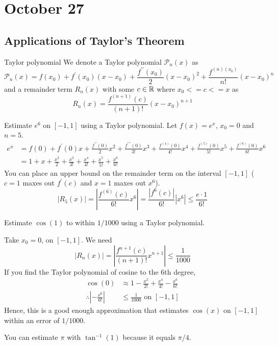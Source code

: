 \chapter{October 27}

\section{Applications of Taylor's Theorem}
\begin{definition}{Taylor polynomial}{}
    We denote a Taylor polynomial $\mathcal{P}_n(x)$ as
    $$\mathcal{P}_n(x)=f\left(x_0\right)+f^{\prime}\left(x_0\right)\left(x-x_0\right)+\frac{f^{\prime \prime}\left(x_0\right)}{2}\left(x-x_0\right)^2+\frac{f^{(n)\left(x_0\right)}}{n !}\left(x-x_0\right)^n$$ 
    and a remainder term $R_n(x)$ with some $c \in \mathbb{R}$ where $x_0 <= c <= x$ as 
    $$R_n(x)=\frac{f^{(n+1)}(c)}{(n+1) !}\left(x-x_0\right)^{n+1}$$
\end{definition}

\begin{example}{}{}
    Estimate $e^6$ on $[-1,1]$ using a Taylor polynomial.
    \noindent Let $f(x)=e^x$, $x_0=0$ and $n=5$.
    \begin{align*}
        e^x &=f(0)+f^{\prime}(0) x+\frac{f^{\prime \prime}(0)}{2} x^2+\frac{f^{\prime \prime \prime}(0)}{3 !} x^3+\frac{f^{(4)}(0)}{4 !} x^4+\frac{f^{(5)}(0)}{5 !} x^5+\frac{f^{(6)}(0)}{6 !} x^6 \\
        &=1+x+\frac{x^2}{2}+\frac{x^3}{3 !}+\frac{x^4}{4 !}+\frac{x^5}{5 !}+\frac{x^6}{6 !}
    \end{align*}
    You can place an upper bound on the remainder term on the interval $[-1,1]$ ($c=1$ maxes out $f^{\prime}(c)$ and $x=1$ maxes out $x^6$).
    $$\left|R_5(x)\right|=\left|\frac{f^{(6)}(c)}{6 !} x^6\right|=\frac{\left|f^6(c)\right|}{6 !}\left|x^6\right| \leq \frac{e \cdot 1}{6 !}$$
\end{example}

\begin{example}{}{}
    Estimate $\cos (1)$ to within $1 / 1000$ using a Taylor polynomial.

    \noindent Take $x_0=0$, on $[-1,1]$. We need $$\left|R_n(x)\right|=\left|\frac{f^{n+1}(c)}{(n+1) !} x^{n+1}\right| \leq \frac{1}{1000}$$
    If you find the Taylor polynomial of cosine to the 6th degree,
    \begin{align*}
        \cos (0) &\approx 1-\frac{x^2}{2 !}+\frac{x^4}{4 !}-\frac{x^6}{6 !} \\
        \therefore \left|-\frac{x^6}{6 !}\right| &\leq \frac{1}{1000} \text { on }[-1,1]
    \end{align*}
    Hence, this is a good enough approximation that estimates $\cos (x)$ on $[-1,1]$ within an error of $1 / 1000$.
\end{example}
\begin{note}
    You can estimate $\pi$ with $\tan^{-1}(1)$ because it equals $\pi / 4$.
\end{note}

